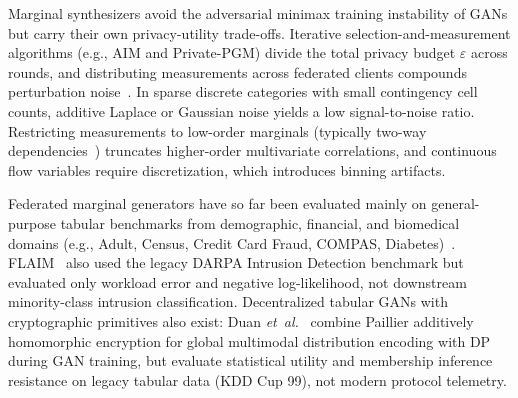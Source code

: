 Marginal synthesizers avoid the adversarial minimax training instability of GANs but carry their own privacy-utility trade-offs. Iterative selection-and-measurement algorithms (e.g., AIM and Private-PGM) divide the total privacy budget $\varepsilon$ across rounds, and distributing measurements across federated clients compounds perturbation noise~\cite{maddock2024, pentyala2024}. In sparse discrete categories with small contingency cell counts, additive Laplace or Gaussian noise yields a low signal-to-noise ratio. Restricting measurements to low-order marginals (typically two-way dependencies~\cite{li2026}) truncates higher-order multivariate correlations, and continuous flow variables require discretization, which introduces binning artifacts.

Federated marginal generators have so far been evaluated mainly on general-purpose tabular benchmarks from demographic, financial, and biomedical domains (e.g., Adult, Census, Credit Card Fraud, COMPAS, Diabetes)~\cite{maddock2024, pentyala2024, li2026}. FLAIM~\cite{maddock2024} also used the legacy DARPA Intrusion Detection benchmark but evaluated only workload error and negative log-likelihood, not downstream minority-class intrusion classification. Decentralized tabular GANs with cryptographic primitives also exist: Duan \textit{et~al.}~\cite{duan2023} combine Paillier additively homomorphic encryption for global multimodal distribution encoding with DP during GAN training, but evaluate statistical utility and membership inference resistance on legacy tabular data (KDD Cup 99), not modern protocol telemetry.

